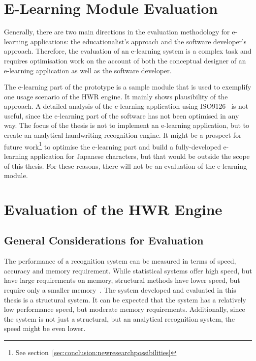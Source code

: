 \section{E-Learning Module Evaluation}
\label{sec:eval:elearning}
Generally, there are two main directions in the evaluation methodology
for e-learning applications: the educationalist's approach and the 
software developer's approach.
Therefore, the evaluation of an e-learning system is a complex task
and requires optimisation work on the account of both the conceptual
designer of an e-learning application as well as the software developer.

The e-learning part of the prototype is a sample module that is used 
to exemplify one usage scenario of the HWR engine. 
It mainly shows plausibility of the approach. A detailed analysis of the
e-learning application using ISO9126~ is not useful,
since the e-learning part of the software has not been optimised in any way.
The focus of the thesis is not to implement an e-learning application,
but to create an analytical handwriting recognition engine.
It might be a prospect for future 
work\footnote{See section~\ref{sec:conclusion:newresearchpossibilities}}
to optimise the e-learning part and build a fully-developed e-learning
application for Japanese characters, but that would be outside the scope of 
this thesis. For these reasons, there will not be an evaluation of the
e-learning module.

\section{Evaluation of the HWR Engine}
\label{sec:eval:hwreval}

\subsection{General Considerations for Evaluation}
\label{sec:eval:generalconsiderations}

The performance of a recognition system can be measured in terms of speed,
accuracy and memory requirement.
While statistical systems offer high speed, 
but have large requirements on memory,
structural methods have lower speed, but require only a smaller 
memory~.
The system developed and evaluated in this thesis is a structural system.
It can be expected that the system has a relatively low performance speed,
but moderate memory requirements. 
Additionally, since the system is not just a structural, but an analytical
recognition system, the speed might be even lower.

